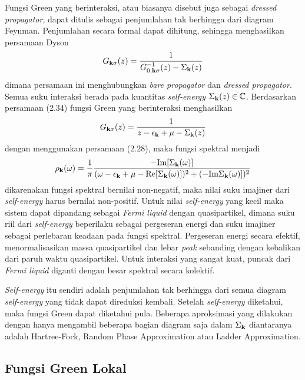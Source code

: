 Fungsi Green yang berinteraksi, atau biasanya disebut juga sebagai \textit{dressed propagator}, dapat ditulis sebagai penjumlahan tak berhingga dari diagram Feynman\cite{spektral}. Penjumlahan secara formal dapat dihitung, sehingga menghasilkan persamaan Dyson
\begin{align}
G_{\textbf{k}\sigma}(z) = \frac{1}{G^{-1}_{0,\textbf{k}\sigma}(z) - \Sigma_{\textbf{k}}(z)}
\end{align}
dimana persamaan ini menghubungkan \textit{bare propagator} dan \textit{dressed propagator}. Semua suku interaksi berada pada kuantitas \textit{self-energy} $\Sigma_{\textbf{k}}(z) \in \mathbb{C}$. Berdasarkan persamaan (2.34) fungsi Green yang berinteraksi menghasilkan 
\begin{align}
G_{\textbf{k}\sigma}(z) = \frac{1}{z - \epsilon_{\textbf{k}} + \mu - \Sigma_{\textbf{k}}(z)}
\end{align}
dengan menggunakan persamaan (2.28), maka fungsi spektral menjadi
\begin{align}
\rho_{\textbf{k}}(\omega) = \frac{1}{\pi} \frac{-\text{Im}[\Sigma_{\textbf{k}}(\omega)]}{(\omega - \epsilon_{\textbf{k}} + \mu - \text{Re}[\Sigma_{\textbf{k}}(\omega)])^2 + (-\text{Im}\Sigma_{\textbf{k}}(\omega)])^2}
\end{align}
dikarenakan fungsi spektral bernilai non-negatif, maka nilai suku imajiner dari \textit{self-energy} harus bernilai non-positif. Untuk nilai \textit{self-energy} yang kecil maka sistem dapat dipandang sebagai \textit{Fermi liquid} dengan quasipartikel, dimana suku riil dari \textit{self-energy} beperilaku sebagai pergeseran energi dan suku imajiner sebagai perlebaran keadaan pada fungsi spektral. Pergeseran energi secara efektif, menormalisasikan massa quasipartikel dan lebar \textit{peak} sebanding dengan kebalikan dari paruh waktu quasipartikel. Untuk interaksi yang sangat kuat, puncak dari \textit{Fermi liquid} diganti dengan besar spektral secara kolektif.

\textit{Self-energy} itu sendiri adalah penjumlahan tak berhingga dari semua diagram \textit{self-energy} yang tidak dapat direduksi kembali. Setelah \textit{self-energy} diketahui, maka fungsi Green dapat diketahui pula. Beberapa aproksimasi yang dilakukan dengan hanya mengambil beberapa bagian diagram saja dalam $\Sigma_{\textbf{k}}$ diantaranya adalah Hartree-Fock, Random Phase Approximation atau Ladder Approximation\cite{ladder}. 

\subsection{Fungsi Green Lokal}

